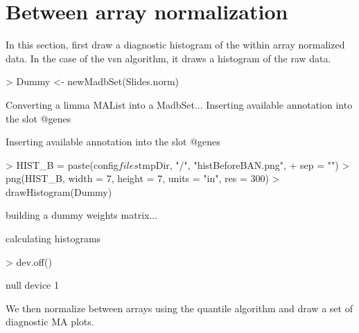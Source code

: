 \documentclass[titlepage]{article}
\begin{document}
\section{Between array normalization}
In this section, first draw a diagnostic histogram of the within array 
normalized data. In the case of the vsn algorithm, it draws a histogram
of the raw data.
\begin{Schunk}
\begin{Sinput}
> Dummy <- newMadbSet(Slides.norm)
\end{Sinput}
\begin{Soutput}
Converting a limma MAList into a MadbSet...
Inserting available annotation into the slot @genes

Inserting available annotation into the slot @genes
\end{Soutput}
\begin{Sinput}
> HIST_B = paste(config$files$tmpDir, "/", "histBeforeBAN.png", 
+     sep = "")
> png(HIST_B, width = 7, height = 7, units = "in", res = 300)
> drawHistogram(Dummy)
\end{Sinput}
\begin{Soutput}
building a dummy weights matrix... 

calculating histograms 
\end{Soutput}
\begin{Sinput}
> dev.off()
\end{Sinput}
\begin{Soutput}
null device 
          1 
\end{Soutput}
\end{Schunk}
We then normalize between arrays using the quantile 
algorithm and draw a set of diagnostic MA  plots. 
\end{document}
